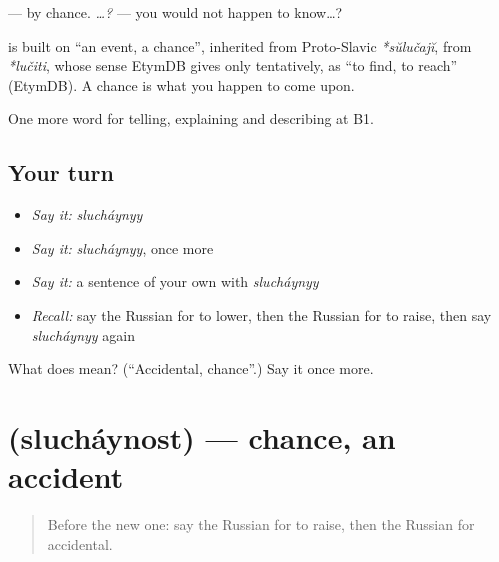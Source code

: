 \emph{} — by chance. \emph{   …?} — you would not happen to know…?

\begin{cousinweb}
\textbf{} is built on \emph{} \textquotedblleft{}an event, a chance\textquotedblright{}, inherited from Proto-Slavic \emph{*sŭlučajĭ}, from \emph{*lučiti}, whose sense EtymDB gives only tentatively, as \textquotedblleft{}to find, to reach\textquotedblright{} (EtymDB). A chance is what you happen to come upon.
\end{cousinweb}

\begin{grammarlens}[title={What you've built}]
One more word for telling, explaining and describing at B1.
\end{grammarlens}

\subsection*{Your turn}
\begin{itemize}
\raggedright
  \item \emph{Say it:} \emph{slucháynyy}
  \item \emph{Say it:} \emph{slucháynyy}, once more
  \item \emph{Say it:} a sentence of your own with \emph{slucháynyy}
  \item \emph{Recall:} say the Russian for to lower, then the Russian for to raise, then say \emph{slucháynyy} again
\end{itemize}

\begin{tcolorbox}[breakable,colback=teal!4,colframe=teal!35!black,title={Before you move on}]
What does  mean? (\textquotedblleft{}Accidental, chance\textquotedblright{}.) Say it once more.
\end{tcolorbox}
\section[\texorpdfstring{\ru{случайность} (slucháynost)}{случайность (slucháynost)}]{ (slucháynost) — chance, an accident}

\label{lesson:RU-C355-sluchaynost}



\begin{quote}
Before the new one: say the Russian for to raise, then the Russian for accidental.
\end{quote}

